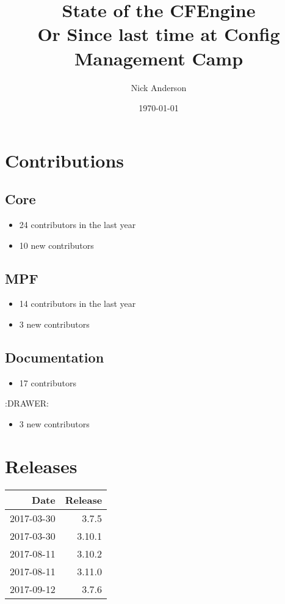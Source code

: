 \documentclass[11pt]{article}
\author{Nick Anderson}
\date{\today}
\title{State of the CFEngine\\\medskip
\large Or Since last time at Config Management Camp}
\begin{document}
\maketitle
\section*{Contributions}
\label{sec:org9aeae65}
\subsection*{Core}
\label{sec:orgc681ce0}

\begin{itemize}
\item 24 contributors in the last year
\end{itemize}
\begin{itemize}
\item 10 new contributors
\end{itemize}

\subsection*{MPF}
\label{sec:orgc145424}
\begin{itemize}
\item 14 contributors in the last year
\end{itemize}
\begin{itemize}
\item 3 new contributors
\end{itemize}

\subsection*{Documentation}
\label{sec:org78cadc2}
\begin{itemize}
\item 17 contributors
\end{itemize}
:DRAWER:
\begin{itemize}
\item 3 new contributors
\end{itemize}

\section*{Releases}
\label{sec:orgd607242}

\begin{center}
\begin{tabular}{rr}
Date & Release\\
\hline
2017-03-30 & 3.7.5\\
2017-03-30 & 3.10.1\\
2017-08-11 & 3.10.2\\
2017-08-11 & 3.11.0\\
2017-09-12 & 3.7.6\\
\end{tabular}
\end{center}
\end{document}
